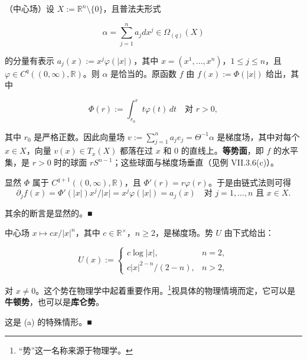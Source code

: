\begin{example}

\begin{items}
\item

（中心场）设 $ X := \mathbb{R}^{n}\setminus\{0\} $，且普法夫形式

\[
\alpha = \sum_{j=1}^{n}a_{j}dx^{j} \in \Omega_{(q)}(X)
\]

的分量有表示 $ a_{j}(x) := x^{j}\varphi(|x|) $，其中 $ x = (x^{1},\ldots,x^{n}) $，$ 1 \le j \le n $，且 $ \varphi \in C^{q}((0,\infty),\mathbb{R}) $。则 $ \alpha $ 是恰当的。原函数 $ f $ 由 $ f(x) := \Phi(|x|) $ 给出，其中

\[
\Phi(r) := \int_{r_{0}}^{r}t\varphi(t)\,dt \quad \text{对 } r > 0 ,
\]

其中 $ r_{0} $ 是严格正数。因此向量场 $ v := \sum_{j=1}^{n}a_{j}e_{j} = \Theta^{-1}\alpha $ 是梯度场，其中对每个 $ x \in X $，向量 $ v(x) \in T_{x}(X) $ 都落在过 $ x $ 和 $ 0 $ 的直线上。\textbf{等势面}，即 $ f $ 的水平集，是 $ r > 0 $ 时的球面 $ rS^{n-1} $；这些球面与梯度场垂直（见例 VII.3.6(c)）。

\end{items}


\proofhead
显然 $ \Phi $ 属于 $ C^{q+1}((0,\infty),\mathbb{R}) $，且 $ \Phi'(r) = r\varphi(r) $。于是由链式法则可得
\[
\partial_{j}f(x) = \Phi'(|x|)x^{j}/|x| = x^{j}\varphi(|x|) = a_{j}(x) \quad \text{对 } j = 1,\ldots,n \text{ 且 } x \in X .
\]

其余的断言是显然的。\nobreak\hspace{0.35em}■

\begin{items}
\item[（b）]

中心场 $ x \mapsto cx/|x|^{n} $，其中 $ c \in \mathbb{R}^{\times} $，$ n \ge 2 $，是梯度场。势 $ U $ 由下式给出：

\begin{equation*}
U(x) := \left\{\begin{array}{ll}c\log|x| , & n = 2 , \\ c|x|^{2-n}/(2-n) , & n > 2 ,\end{array}\right.
\end{equation*}

对 $ x \ne 0 $。这个势在物理学中起着重要作用。\footnote{“势”这一名称来源于物理学。}视具体的物理情境而定，它可以是\textbf{牛顿势}，也可以是\textbf{库仑势}。

\proofhead
这是 (a) 的特殊情形。\nobreak\hspace{0.35em}■
\end{items}

\end{example}

